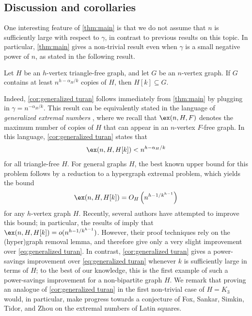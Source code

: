 \subsection{Discussion and corollaries}
One interesting feature of \cref{thm:main} is that we do not assume that $n$ is sufficiently large with respect to $\gamma$, in contrast to previous results on this topic. In particular, \cref{thm:main} gives a non-trivial result even when $\gamma$ is a small negative power of $n$, as stated in the following result.
\begin{corollary}\label{cor:generalized turan}
    Let $H$ be an $h$-vertex triangle-free graph, and let $G$ be an $n$-vertex graph. If $G$ contains at least $n^{h-\alpha_H/k}$ copies of $H$, then $H[k] \subseteq G$.
\end{corollary}
Indeed, \cref{cor:generalized turan} follows immediately from \cref{thm:main} by plugging in $\gamma = n^{-\alpha_H/k}$. This result can be equivalently stated in the language of \emph{generalized extremal numbers} \cite{MR3548290}, where we recall that $\ex(n, H, F)$ denotes the maximum number of copies of $H$ that can appear in an $n$-vertex $F$-free graph. In this language, \cref{cor:generalized turan} states that $$\ex(n,H,H[k]) < n^{h-\alpha_H/k}$$ for all triangle-free $H$. For general graphs $H$, the best known upper bound for this problem follows by a reduction to a hypergraph extremal problem, which yields the bound
\begin{equation}\label{eq:generalized turan}
\ex(n,H,H[k]) = O_H\left(n^{h - 1/k^{h-1}}\right)
\end{equation}
for any $h$-vertex graph $H$. Recently, several authors \cite{2402.16818,2405.07763,MR4546048} have attempted to improve this bound; in particular, the results of \cite{2402.16818,2405.07763} imply that $\ex(n,H,H[k]) = o(n^{h-1/k^{h-1}})$. However, their proof techniques rely on the (hyper)graph removal lemma, and therefore give only a very slight improvement over \eqref{eq:generalized turan}. In contrast, \cref{cor:generalized turan} gives a power-savings improvement over \eqref{eq:generalized turan} whenever $k$ is sufficiently large in terms of $H$; to the best of our knowledge, this is the first example of such a power-savings improvement for a non-bipartite graph $H$. We remark that proving an analogue of \cref{cor:generalized turan} in the first non-trivial case of $H=K_3$ would, in particular, make progress towards a conjecture of Fox, Sankar, Simkin, Tidor, and Zhou \cite[Conjecture 6.4]{2401.00359} on the extremal numbers of Latin squares. 


